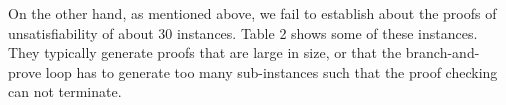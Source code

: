 On the other hand, as mentioned above, we fail to establish about the proofs of unsatisfiability of about 30 instances. Table 2 shows some of these instances. They typically generate proofs that are large in size, or that the branch-and-prove loop has to generate too many sub-instances such that the proof checking can not terminate. 

